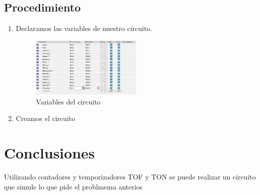 \documentclass[12pt]{report}
\begin{document}
\section{Procedimiento}
\begin{enumerate}
  \item Declaramos las variables de nuestro circuito.
  \begin{figure}[H]
    \centering
    \includegraphics[width=0.5\textwidth]{screenshots/variables.jpg}
    \caption{Variables del circuito}
    \label{fig:variables}
  \end{figure}
  \item Creamos el circuito
  
\end{enumerate}

\newpage

\newpage

\chapter{Conclusiones}
Utilizando contadores y temporizadores TOF y TON se puede realizar un circuito que simule lo que pide el problmema anterios
\newpage
\end{document}
